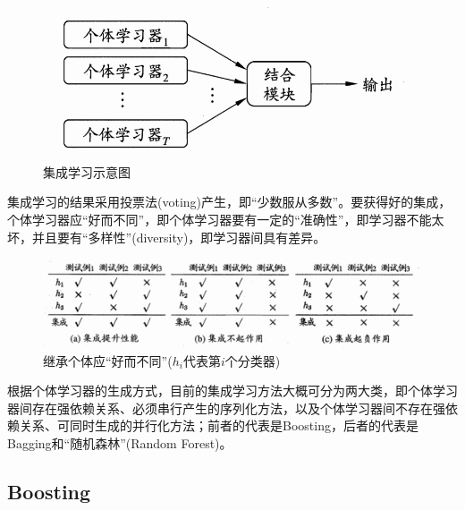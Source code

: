 \documentclass[cn,hazy,black,normal]{elegantnote}
\numberwithin{equation}{section}
\numberwithin{figure}{section}
\begin{document}
			\begin{figure}[H]
				\centering
				\includegraphics[width=.6\linewidth]{images/ensemble-learning.png}
				\caption{{\rm 集成学习示意图}}
				\label{ensemble-learning}
			\end{figure}
			
			集成学习的结果采用投票法(voting)产生，即“少数服从多数”。要获得好的集成，个体学习器应“好而不同”，即个体学习器要有一定的“准确性”，即学习器不能太坏，并且要有“多样性”(diversity)，即学习器间具有差异。
			
			\begin{figure}[H]
				\centering
				\includegraphics[width=.8\linewidth]{images/ensemble-learning2.png}
				\caption{{\rm 继承个体应“好而不同”($h_i$代表第$i$个分类器)}}
				\label{ensemble-learning2}
			\end{figure}
			
			根据个体学习器的生成方式，目前的集成学习方法大概可分为两大类，即个体学习器间存在强依赖关系、必须串行产生的序列化方法，以及个体学习器间不存在强依赖关系、可同时生成的并行化方法；前者的代表是Boosting，后者的代表是Bagging和“随机森林”(Random Forest)。

		\subsection{Boosting}
			
			
			
			
			
			
			
			
			
			
			
			
			
			
			
			
			
			
			
			
			
			
		
\end{document}
